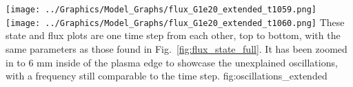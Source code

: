 	{\texttt{[image: ../Graphics/Model\_Graphs/flux\_G1e20\_extended\_t1059.png]}
	\texttt{[image: ../Graphics/Model\_Graphs/flux\_G1e20\_extended\_t1060.png]}}
	{These state and flux plots are one time step from each other, top to bottom, with the same parameters as those found in Fig.~\ref{fig:flux_state_full}.
	It has been zoomed in to 6 mm inside of the plasma edge to showcase the unexplained oscillations, with a frequency still comparable to the time step.}
	{fig:oscillations_extended}

